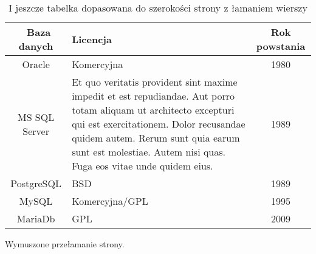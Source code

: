 \begin{table}[tb] \small
    \centering
    \caption{I jeszcze tabelka dopasowana do szerokości strony z łamaniem wierszy}
    \label{tab:przyklad_pierwszy}
    \begin{tabularx}{0.85\linewidth}{|c|X|c|} \hline \tableheadercolor \
        Baza danych   & Licencja                                                                                                                                                                                                                                                              & Rok powstania \\ \hline \hline
        Oracle        & Komercyjna                                                                                                                                                                                                                                                            & 1980          \\ \hline
        MS SQL Server & Et quo veritatis provident sint maxime impedit et est repudiandae. Aut porro totam aliquam ut architecto excepturi qui est exercitationem. Dolor recusandae quidem autem. Rerum sunt quia earum sunt est molestiae. Autem nisi quas. Fuga eos vitae unde quidem eius. & 1989          \\ \hline
        PostgreSQL    & BSD                                                                                                                                                                                                                                                                   & 1989          \\ \hline
        MySQL         & Komercyjna/GPL                                                                                                                                                                                                                                                        & 1995          \\ \hline
        MariaDb       & GPL                                                                                                                                                                                                                                                                   & 2009          \\ \hline
    \end{tabularx}
\end{table}

Wymuszone przełamanie strony.
\clearpage

